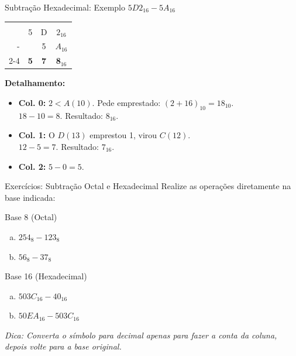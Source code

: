 \begin{frame}{Subtração Hexadecimal: Exemplo $5D2_{16} - 5A_{16}$}
    \centering
    \Large
    \begin{tabular}{r ccc}
        \color{red}{\footnotesize (emprestado)} &            & \color{red}{-1} & \color{red}{+$10_{16}$} \\
                                                & 5          & D               & $2_{16}$                \\
        -                                       &            & 5               & $A_{16}$                \\ \cline{2-4}
                                                & \textbf{5} & \textbf{7}      & \textbf{8$_{16}$}       \\
    \end{tabular}

    \vspace{0.4cm}
    \flushleft
    \normalsize \textbf{Detalhamento:}
    \begin{itemize}
        \item \textbf{Col. 0:} $2 < A (10)$. Pede emprestado: $(2 + 16)_{10} = 18_{10}$. \\
              $18 - 10 = 8$. Resultado: \textbf{$8_{16}$}.
        \item \textbf{Col. 1:} O $D (13)$ emprestou 1, virou $C (12)$. \\
              $12 - 5 = 7$. Resultado: \textbf{$7_{16}$}.
        \item \textbf{Col. 2:} $5 - 0 = 5$.
    \end{itemize}
\end{frame}

\begin{frame}{Exercícios: Subtração Octal e Hexadecimal}
    Realize as operações diretamente na base indicada:

    \begin{block}{Base 8 (Octal)}
        \begin{enumerate}[a)]
            \item $254_8 - 123_8$
            \item $56_8 - 37_8$
        \end{enumerate}
    \end{block}

    \begin{block}{Base 16 (Hexadecimal)}
        \begin{enumerate}[a)]
            \item $503C_{16} - 40_{16}$
            \item $50EA_{16} - 503C_{16}$
        \end{enumerate}
    \end{block}

    \vspace{0.3cm}
    \centering
    \small \textit{Dica: Converta o símbolo para decimal apenas para fazer a conta da coluna, depois volte para a base original.}
\end{frame}

